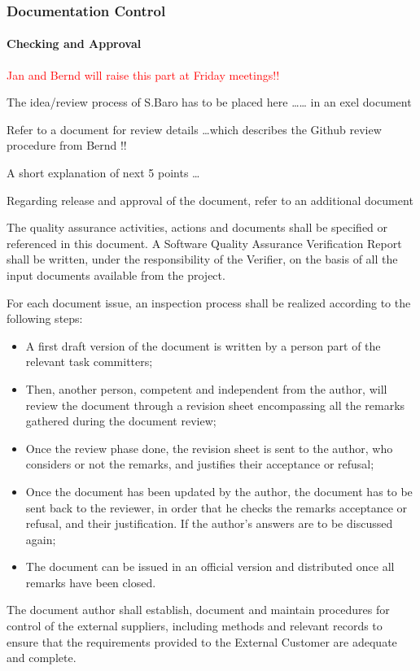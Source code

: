 \documentclass{template/openetcs_article}
\begin{document}
\subsubsection{Documentation Control}

\paragraph{Checking and Approval}
\textcolor{red}{Jan and Bernd will raise this part at Friday meetings!!}

The idea/review process of S.Baro has to be placed here {\dots}{\dots} in an exel document

Refer to a document for review details {\dots}which describes the Github review procedure from Bernd !!

A short explanation of next 5 points {\dots}

Regarding release and approval of the document, refer to an additional document 

The quality assurance activities, actions and documents shall be specified or referenced in this document. A Software Quality Assurance Verification Report shall be written, under the responsibility of the Verifier, on the basis of all the input documents available from the project.

For each document issue, an inspection process shall be realized according to the following steps:
\begin{itemize}
\item A first draft version of the document is written by a person part of the relevant task committers;
\item Then, another person, competent and independent from the author, will review the document through a revision sheet encompassing all the remarks gathered during the document review;
\item Once the review phase done, the revision sheet is sent to the author, who considers or not the remarks, and justifies their acceptance or refusal;
\item Once the document has been updated by the author, the document has to be sent back to the reviewer, in order that he checks the remarks acceptance or refusal, and their justification. If the author{\textquoteright}s answers are to be discussed again;
\item The document can be issued in an official version and distributed once all remarks have been closed.
\end{itemize}
The document author shall establish, document and maintain procedures for control of the external suppliers, including methods and relevant records to ensure that the requirements provided to the External Customer are adequate and complete.
\end{document}
